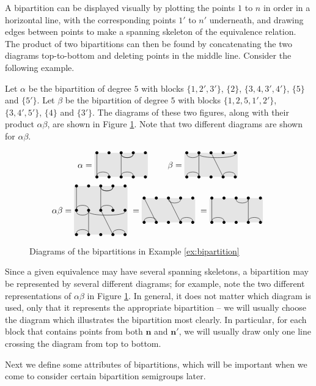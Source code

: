 A bipartition can be displayed visually by plotting the points $1$ to $n$ in
order in a horizontal line, with the corresponding points $1'$ to $n'$
underneath, and drawing edges between points to make a spanning skeleton of the
equivalence relation.  The product of two bipartitions can then be found by
concatenating the two diagrams top-to-bottom and deleting points in the middle
line.  Consider the following example.

\begin{example}
  \label{ex:bipartition}
  Let $\alpha$ be the bipartition of degree $5$ with blocks $\{1, 2', 3'\}$,
  $\{2\}$, $\{3, 4, 3', 4'\}$, $\{5\}$ and $\{5'\}$.  Let $\beta$ be the
  bipartition of degree $5$ with blocks $\{1, 2, 5, 1', 2'\}$, $\{3, 4', 5'\}$,
  $\{4\}$ and $\{3'\}$.  The diagrams of these two figures, along with their
  product $\alpha \beta$, are shown in Figure \ref{fig:bipartition-example}.
  Note that two different diagrams are shown for $\alpha \beta$.
  \begin{figure}[ht]
    \centering
    $$\alpha = \bipartdiag{\tv11\bc12 \tc34 \tv33\tc34\bc34} \qquad
    \beta = \bipartdiag{\tc12\tc25\tv22\bc12 \tv34\bc45}$$
    $$\alpha \beta = \doublebipartdiag{\utv11\ubc12 \utc34 \utv33\utc34\ubc34
      \tc12\tc25\tv22\bc12 \tv34\bc45}
    = \bipartdiag{\tv12\bc12 \tc34\tv34\bc45}
    = \bipartdiag{\tv11\bc12 \tc34\tv44\bc45}$$
    \caption{Diagrams of the bipartitions in Example \ref{ex:bipartition}}
    \label{fig:bipartition-example}
  \end{figure}
\end{example}

Since a given equivalence may have several spanning skeletons, a bipartition may
be represented by several different diagrams; for example, note the two
different representations of $\alpha \beta$ in Figure
\ref{fig:bipartition-example}.  In general, it does not matter which diagram is
used, only that it represents the appropriate bipartition -- we will usually
choose the diagram which illustrates the bipartition most clearly.  In
particular, for each block that contains points from both $\mathbf{n}$ and
$\mathbf{n}'$, we will usually draw only one line crossing the diagram from top
to bottom.

Next we define some attributes of bipartitions, which will be important when we
come to consider certain bipartition semigroups later.

